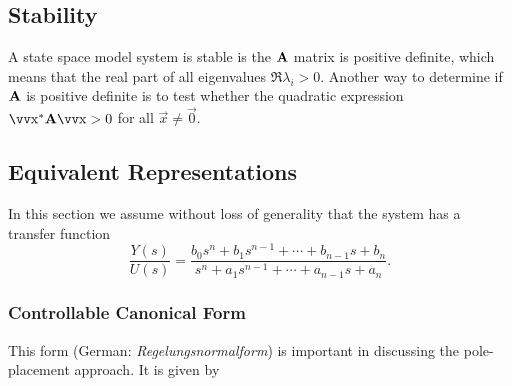 \subsection{Stability} \label{sec:stability}

A state space model system is stable is the \(\bm{\mathrm{A}}\) matrix is positive definite, which means that the real part of all eigenvalues \(\Re{\lambda_i} > 0\). Another way to determine if \(\bm{\mathrm{A}}\) is positive definite is to test whether the quadratic expression \(\vec{x}^* \mx{A} \vec{x} > 0\) for all \(\vec{x} \neq \vec{0}\).

\subsection{Equivalent Representations}

In this section we assume without loss of generality that the system has a transfer function
\[
	\frac{Y(s)}{U(s)} = \frac{
		b_0 s^n + b_1 s^{n-1} + \cdots + b_{n-1} s + b_n
	}{
		s^n + a_1 s^{n-1} + \cdots + a_{n-1} s + a_n
	}.
\]

\subsubsection{Controllable Canonical Form}

This form (German: \textsl{Regelungsnormalform}) is important in discussing the pole-placement approach. It is given by

\par\vspace{.5em}\noindent{}

